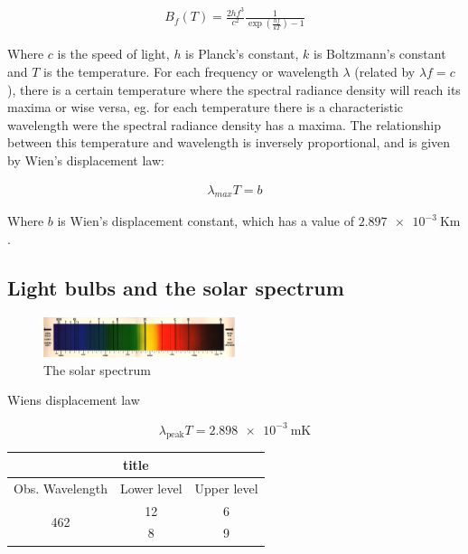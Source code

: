\begin{align}
B_{f}(T)= \frac{2hf^3}{c^2}\frac{1}{\exp(\frac{hf}{kT})-1}
\label{planck}
\end{align}

Where $c$ is the speed of light, $h$ is Planck's constant, $k$ is Boltzmann's constant and $T$ is the temperature. For each frequency or wavelength $\lambda$ (related by $\lambda f = c$), there is a certain temperature where the spectral radiance density will reach its maxima or wise versa, eg. for each temperature there is a characteristic wavelength were the spectral radiance density has a maxima. The relationship between this temperature and wavelength is inversely proportional, and is given by Wien's displacement law:

\begin{align}
\lambda_{max}T=b
\label{wien}
\end{align}

Where $b$ is Wien's displacement constant, which has a value of $\SI{2.897 e-3}{\kelvin \meter}$. 


\subsection{Light bulbs and the solar spectrum}



\begin{figure}[h!]
    \centering
    \includegraphics[width=0.5\textwidth]{solarspectrum}
    \caption{The solar spectrum}
    \label{fig:solarspectrum}
\end{figure}

Wiens displacement law

\begin{equation}
    \lambda_{\text{peak}}T = \SI{2.898e-3}{\meter\kelvin} \label{eq:wien}
\end{equation}

\begin{table}
	\begin{tabular}[h]{ccc}
		\toprule
		\multicolumn{3}{c}{title}\\
		\midrule
		Obs. Wavelength & Lower level & Upper level  \\
		\multirow{2}{*}{462} & 12  & 6 \\
		 & 8 & 9 \\
		\bottomrule
	\end{tabular}
\end{table}
